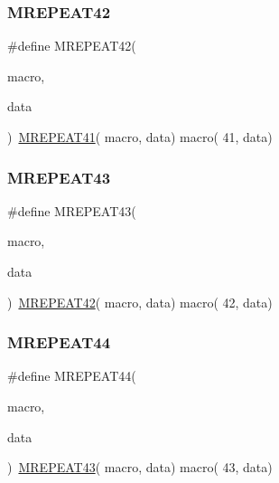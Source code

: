 \mbox{\label{group__group__sam0__utils__mrepeat_gab6109bc5321c78307694174520c00217}} 
\subsubsection{\texorpdfstring{MREPEAT42}{MREPEAT42}}
{\footnotesize\ttfamily \#define M\+R\+E\+P\+E\+A\+T42(\begin{DoxyParamCaption}\item[{}]{macro,  }\item[{}]{data }\end{DoxyParamCaption})~\mbox{\hyperlink{group__group__sam0__utils__mrepeat_ga1c029ee082fe728ca07ac8fb71fbe4d9}{M\+R\+E\+P\+E\+A\+T41}}( macro, data)   macro( 41, data)}

\mbox{\label{group__group__sam0__utils__mrepeat_ga1e33b119c4bd161e0262399c67ccc6c8}} 
\subsubsection{\texorpdfstring{MREPEAT43}{MREPEAT43}}
{\footnotesize\ttfamily \#define M\+R\+E\+P\+E\+A\+T43(\begin{DoxyParamCaption}\item[{}]{macro,  }\item[{}]{data }\end{DoxyParamCaption})~\mbox{\hyperlink{group__group__sam0__utils__mrepeat_gab6109bc5321c78307694174520c00217}{M\+R\+E\+P\+E\+A\+T42}}( macro, data)   macro( 42, data)}

\mbox{\label{group__group__sam0__utils__mrepeat_ga2b24fe07a9548203e922430255d5dba1}} 
\subsubsection{\texorpdfstring{MREPEAT44}{MREPEAT44}}
{\footnotesize\ttfamily \#define M\+R\+E\+P\+E\+A\+T44(\begin{DoxyParamCaption}\item[{}]{macro,  }\item[{}]{data }\end{DoxyParamCaption})~\mbox{\hyperlink{group__group__sam0__utils__mrepeat_ga1e33b119c4bd161e0262399c67ccc6c8}{M\+R\+E\+P\+E\+A\+T43}}( macro, data)   macro( 43, data)}

